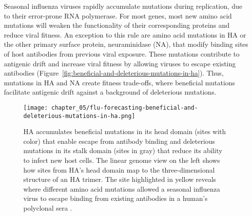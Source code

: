 Seasonal influenza viruses rapidly accumulate mutations during replication, due to their error-prone RNA polymerase.
For most genes, most new amino acid mutations will weaken the functionality of their corresponding proteins and reduce viral fitness.
An exception to this rule are amino acid mutations in HA or the other primary surface protein, neuraminidase (NA), that modify binding sites of host antibodies from previous viral exposure.
These mutations contribute to antigenic drift and increase viral fitness by allowing viruses to escape existing antibodies (Figure~\ref{fig:beneficial-and-deleterious-mutations-in-ha}).
Thus, mutations in HA and NA create fitness trade-offs, where beneficial mutations facilitate antigenic drift against a background of deleterious mutations.

\begin{figure}
  \centering
  \texttt{[image: chapter\_05/flu-forecasting-beneficial-and-deleterious-mutations-in-ha.png]}
  \caption{HA accumulates beneficial mutations in its head domain (sites with color) that enable escape from antibody binding and deleterious mutations in its stalk domain (sites in gray) that reduce its ability to infect new host cells.
    The linear genome view on the left shows how sites from HA's head domain map to the three-dimensional structure of an HA trimer.
    The site highlighted in yellow reveals where different amino acid mutations allowed a seasonal influenza virus to escape binding from existing antibodies in a human's polyclonal sera \citep{Lee2019}.
}
\end{figure}
